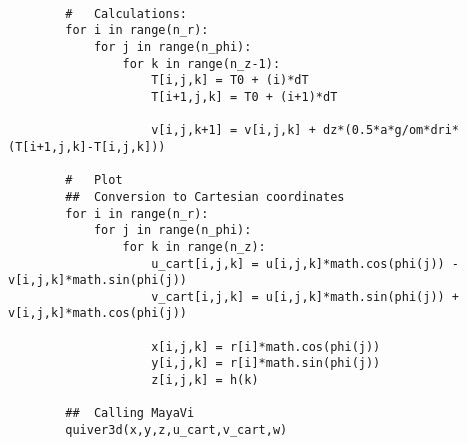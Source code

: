 \documentclass[12pt, a4paper]{article} %
\begin{document}
\begin{lstlisting}
		
		#   Calculations:
		for i in range(n_r):
		    for j in range(n_phi):
		        for k in range(n_z-1):
		            T[i,j,k] = T0 + (i)*dT
		            T[i+1,j,k] = T0 + (i+1)*dT
		
		            v[i,j,k+1] = v[i,j,k] + dz*(0.5*a*g/om*dri*(T[i+1,j,k]-T[i,j,k]))
		
		#	Plot
		##	Conversion to Cartesian coordinates
		for i in range(n_r):
		    for j in range(n_phi):
		        for k in range(n_z):
		            u_cart[i,j,k] = u[i,j,k]*math.cos(phi(j)) - v[i,j,k]*math.sin(phi(j))
		            v_cart[i,j,k] = u[i,j,k]*math.sin(phi(j)) + v[i,j,k]*math.cos(phi(j))
		
		            x[i,j,k] = r[i]*math.cos(phi(j))
		            y[i,j,k] = r[i]*math.sin(phi(j))
		            z[i,j,k] = h(k)
		
		##	Calling MayaVi
		quiver3d(x,y,z,u_cart,v_cart,w)
		
		\end{lstlisting}
	
	
\pagebreak
\end{document}
